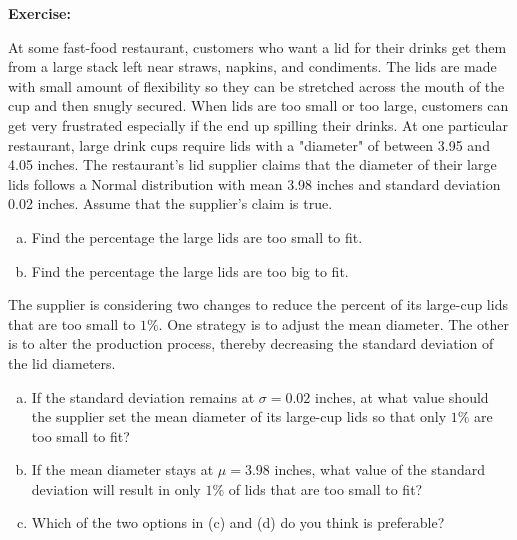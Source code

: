 \documentclass[a4paper, 12pt,twoside]{book}
\begin{document}
\colorbox{champagne}{\begin{minipage}{\textwidth}
\textbf{Exercise:}

At some fast-food restaurant, customers who want a lid for their drinks get them from a large stack left near straws, napkins, and condiments. The lids are made with small amount of flexibility so they can be stretched across the mouth of the cup and then snugly secured. When lids are too small or too large, customers can get very frustrated especially if the end up spilling their drinks. At one particular restaurant, large drink cups require lids with a "diameter" of between 3.95 and 4.05 inches. The restaurant's lid supplier claims that the diameter of their large lids follows a Normal distribution with mean 3.98 inches and standard deviation 0.02 inches. Assume that the supplier's claim is true.
\begin{enumerate}[(a), start = 1]
\item Find the percentage the large lids are too small to fit.
\item Find the percentage the large lids are too big to fit.
\end{enumerate}
The supplier is considering two changes to reduce the percent of its large-cup lids that are too small to $1\%$. One strategy is to adjust the mean diameter. The other is to alter the production process, thereby decreasing the standard deviation of the lid diameters.
\begin{enumerate}[(a), resume]
\item If the standard deviation remains at $\sigma = 0.02$ inches, at what value should the supplier set the mean diameter of its large-cup lids so that only $1\%$ are too  small to fit?
\item If the mean diameter stays at $\mu = 3.98$ inches, what value of the standard deviation will result in only $1\%$  of lids that are too small to fit?
\item Which of the two options in (c) and (d) do you think is preferable?
\end{enumerate}
\end{minipage}
}
\newpage
\end{document}
